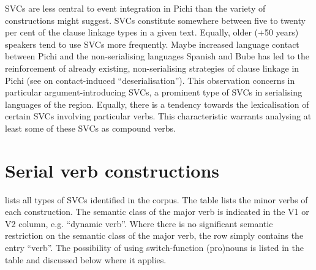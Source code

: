 SVCs are less central to event integration in Pichi than the variety of constructions might suggest. SVCs constitute somewhere between five to twenty per cent of the clause linkage types in a given text. Equally, older (+50 years) speakers tend to use \textsc{SVC}s more frequently. Maybe increased language contact between Pichi and the non-serialising languages Spanish and Bube has led to the reinforcement of already existing, non-serialising strategies of clause linkage in Pichi (see \citet{Hajek2006} on contact-induced “deserialisation”). This observation concerns in particular argument-introducing SVCs, a prominent type of SVCs in serialising languages of the region. Equally, there is a tendency towards the lexicalisation of certain SVCs involving particular verbs. This characteristic warrants analysing at least some of these SVCs as compound verbs\index{}. 


\section{Serial verb constructions}\label{sec:11.2}
 lists all types of SVCs identified in the corpus. The table lists the minor verbs of each construction. The semantic class of the major verb is indicated in the V1 or V2 column, e.g. “dynamic verb”. Where there is no significant semantic restriction on the semantic class of the major verb, the row simply contains the entry “verb”. The possibility of using switch-function (pro)nouns is listed in the table and discussed below where it applies.

